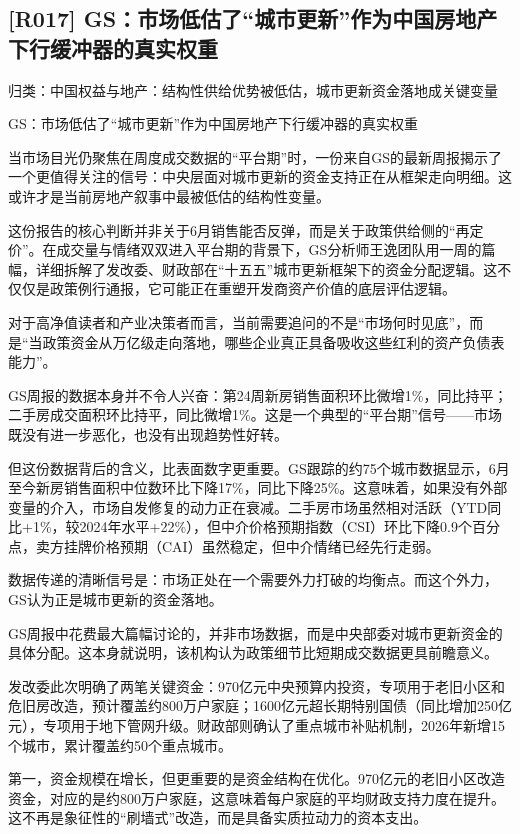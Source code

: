 \documentclass[11pt]{ctexart}
\begin{document}
\subsection{[R017] GS：市场低估了“城市更新”作为中国房地产下行缓冲器的真实权重}
{\small\color{refgray}归类：中国权益与地产：结构性供给优势被低估，城市更新资金落地成关键变量}

GS：市场低估了“城市更新”作为中国房地产下行缓冲器的真实权重

当市场目光仍聚焦在周度成交数据的“平台期”时，一份来自GS的最新周报揭示了一个更值得关注的信号：中央层面对城市更新的资金支持正在从框架走向明细。这或许才是当前房地产叙事中最被低估的结构性变量。

这份报告的核心判断并非关于6月销售能否反弹，而是关于政策供给侧的“再定价”。在成交量与情绪双双进入平台期的背景下，GS分析师王逸团队用一周的篇幅，详细拆解了发改委、财政部在“十五五”城市更新框架下的资金分配逻辑。这不仅仅是政策例行通报，它可能正在重塑开发商资产价值的底层评估逻辑。

对于高净值读者和产业决策者而言，当前需要追问的不是“市场何时见底”，而是“当政策资金从万亿级走向落地，哪些企业真正具备吸收这些红利的资产负债表能力”。

GS周报的数据本身并不令人兴奋：第24周新房销售面积环比微增1\%，同比持平；二手房成交面积环比持平，同比微增1\%。这是一个典型的“平台期”信号——市场既没有进一步恶化，也没有出现趋势性好转。

但这份数据背后的含义，比表面数字更重要。GS跟踪的约75个城市数据显示，6月至今新房销售面积中位数环比下降17\%，同比下降25\%。这意味着，如果没有外部变量的介入，市场自发修复的动力正在衰减。二手房市场虽然相对活跃（YTD同比+1\%，较2024年水平+22\%），但中介价格预期指数（CSI）环比下降0.9个百分点，卖方挂牌价格预期（CAI）虽然稳定，但中介情绪已经先行走弱。

数据传递的清晰信号是：市场正处在一个需要外力打破的均衡点。而这个外力，GS认为正是城市更新的资金落地。

GS周报中花费最大篇幅讨论的，并非市场数据，而是中央部委对城市更新资金的具体分配。这本身就说明，该机构认为政策细节比短期成交数据更具前瞻意义。

发改委此次明确了两笔关键资金：970亿元中央预算内投资，专项用于老旧小区和危旧房改造，预计覆盖约800万户家庭；1600亿元超长期特别国债（同比增加250亿元），专项用于地下管网升级。财政部则确认了重点城市补贴机制，2026年新增15个城市，累计覆盖约50个重点城市。

第一，资金规模在增长，但更重要的是资金结构在优化。970亿元的老旧小区改造资金，对应的是约800万户家庭，这意味着每户家庭的平均财政支持力度在提升。这不再是象征性的“刷墙式”改造，而是具备实质拉动力的资本支出。
\end{document}
